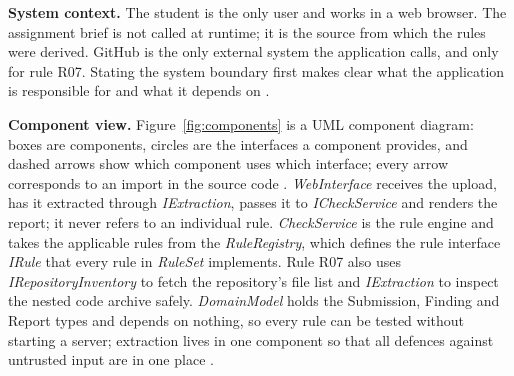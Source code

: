 \documentclass[a4paper,11pt]{article}
\begin{document}
\textbf{System context.} The student is the only user and works in a web
browser. The assignment brief is not called at runtime; it is the source from
which the rules were derived. GitHub is the only external system the application
calls, and only for rule R07. Stating the system boundary first makes clear what
the application is responsible for and what it depends on \citep{Brown2024}.

\textbf{Component view.} Figure~\ref{fig:components} is a UML component diagram:
boxes are components, circles are the interfaces a component provides, and
dashed arrows show which component uses which interface; every arrow corresponds
to an import in the source code \citep{Richards2020}. \textit{WebInterface}
receives the upload, has it extracted through \textit{IExtraction}, passes it to
\textit{ICheckService} and renders the report; it never refers to an individual
rule. \textit{CheckService} is the rule engine and takes the applicable rules from
the \textit{RuleRegistry}, which defines the rule interface \textit{IRule} that
every rule in \textit{RuleSet} implements. Rule R07 also uses
\textit{IRepositoryInventory} to fetch the repository's file list and
\textit{IExtraction} to inspect the nested code archive safely.
\textit{DomainModel} holds the Submission, Finding and Report types and depends on
nothing, so every rule can be tested without starting a server; extraction lives
in one component so that all defences against untrusted input are in one place
\citep{Percival2020, Newman2021}.
\end{document}
